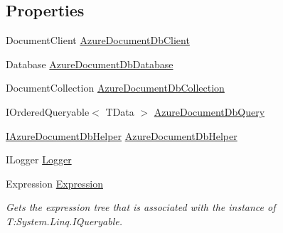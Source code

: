 \subsection*{Properties}
\begin{DoxyCompactItemize}
\item 
Document\+Client \hyperlink{classCqrs_1_1Azure_1_1DocumentDb_1_1DataStores_1_1AzureDocumentDbDataStore_a76ff9f2318e11c5c36063235a9bcdf10}{Azure\+Document\+Db\+Client}
\item 
Database \hyperlink{classCqrs_1_1Azure_1_1DocumentDb_1_1DataStores_1_1AzureDocumentDbDataStore_a9ef620e44e6f04e0720603a9b2bd8215}{Azure\+Document\+Db\+Database}
\item 
Document\+Collection \hyperlink{classCqrs_1_1Azure_1_1DocumentDb_1_1DataStores_1_1AzureDocumentDbDataStore_a281b599a47394eb90b9a5e315a537c9e}{Azure\+Document\+Db\+Collection}
\item 
I\+Ordered\+Queryable$<$ T\+Data $>$ \hyperlink{classCqrs_1_1Azure_1_1DocumentDb_1_1DataStores_1_1AzureDocumentDbDataStore_a85f8d092ece684d0277642f45f550263}{Azure\+Document\+Db\+Query}
\item 
\hyperlink{interfaceCqrs_1_1Azure_1_1DocumentDb_1_1IAzureDocumentDbHelper}{I\+Azure\+Document\+Db\+Helper} \hyperlink{classCqrs_1_1Azure_1_1DocumentDb_1_1DataStores_1_1AzureDocumentDbDataStore_af6e9a6b6b5a22136e4a1f4fde85430c8}{Azure\+Document\+Db\+Helper}
\item 
I\+Logger \hyperlink{classCqrs_1_1Azure_1_1DocumentDb_1_1DataStores_1_1AzureDocumentDbDataStore_af46a754a1576e4c2422b8a5d642abc5c}{Logger}
\item 
Expression \hyperlink{classCqrs_1_1Azure_1_1DocumentDb_1_1DataStores_1_1AzureDocumentDbDataStore_a47d5ae1b47f4166210d1caab58467529}{Expression}
\begin{DoxyCompactList}\small\item\em Gets the expression tree that is associated with the instance of T\+:\+System.\+Linq.\+I\+Queryable. \end{DoxyCompactList}\item 

\end{DoxyCompactItemize}
